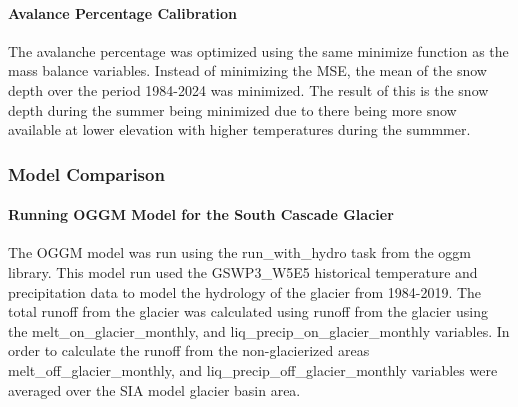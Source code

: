\documentclass{article}
\begin{document}
\paragraph{Avalance Percentage Calibration}
The avalanche percentage was optimized using the same minimize function as the mass balance variables. Instead of minimizing the MSE, the mean of the 
snow depth over the period 1984-2024 was minimized. The result of this is the snow depth during the summer being minimized due to there being more snow 
available at lower elevation with higher temperatures during the summmer. 

\subsubsection{Model Comparison}
\paragraph{Running OGGM Model for the South Cascade Glacier}
The OGGM model was run using the run\_with\_hydro task from the oggm library. This model run used the GSWP3\_W5E5 historical temperature and 
precipitation data \cite{ref10} to model the hydrology of the glacier from 1984-2019. The total runoff from the glacier was calculated using 
runoff from the glacier using the melt\_on\_glacier\_monthly, and liq\_precip\_on\_glacier\_monthly variables. In order 
to calculate the runoff from the non-glacierized areas melt\_off\_glacier\_monthly, and liq\_precip\_off\_glacier\_monthly variables were averaged over the 
SIA model glacier basin area. 
\end{document}
